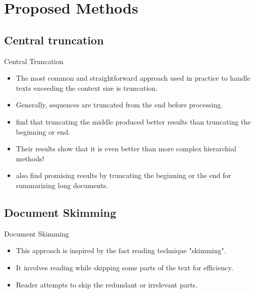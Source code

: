 \section{Proposed Methods}


\subsection{Central truncation}

\begin{frame}{Central Truncation}

	\begin{itemize}
		\item The most common and straightforward approach used in practice to handle texts
		exceeding the context size is truncation.
		\item<2-> Generally, sequences are truncated from the end before processing.
		\item<3-> \citet{sun2019fine} find that truncating the middle produced better results
		than truncating the beginning or end.
		\item<4-> Their results show that it is even better than more complex hierarchial
		methods!
		\item<5> \citet{worsham-kalita-2018-genre} also find promising results by truncating
		the beginning or the end for summarizing long documents.
	\end{itemize}

\end{frame}


\subsection{Document Skimming}

\begin{frame}{Document Skimming}

	\begin{itemize}
		\item This approach is inspired by the fast reading technique "skimming".
		\item<2-> It involves reading while skipping some parts of the text for efficiency.
		\item<3> Reader attempts to skip the redundant or irrelevant parts.
	\end{itemize}



\end{frame}

